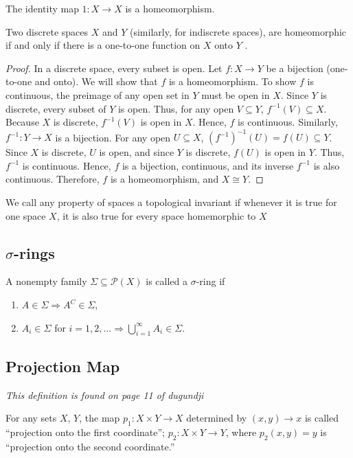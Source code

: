 \documentclass[12pt]{article} %
\begin{document}
\begin{example}
The identity map $1 : X\to X$ is a homeomorphism.
\end{example}

\begin{example}
Two discrete spaces $X$ and $Y$ (similarly, for indiscrete spaces), are homeomorphic if and only if there is a one-to-one function on $X$ onto $Y$ .
\end{example}
\begin{proof}
In a discrete space, every subset is open. Let \( f : X \to Y \) be a bijection (one-to-one and onto). We will show that \( f \) is a homeomorphism. To show \( f \) is continuous, the preimage of any open set in \( Y \) must be open in \( X \). Since \( Y \) is discrete, every subset of \( Y \) is open. Thus, for any open \( V \subseteq Y \),  \( f^{-1}(V) \subseteq X \). Because \( X \) is discrete, \( f^{-1}(V) \) is open in \( X \). Hence, \( f \) is continuous. Similarly, \( f^{-1} : Y \to X \) is a bijection. For any open \( U \subseteq X \), $(f^{-1})^{-1}(U) = f(U) \subseteq Y$. Since \( X \) is discrete, \( U \) is open, and since \( Y \) is discrete, \( f(U) \) is open in \( Y \).  
Thus, \( f^{-1} \) is continuous. Hence, \( f \) is a bijection, continuous, and its inverse \( f^{-1} \) is also continuous. Therefore, \( f \) is a homeomorphism, and \( X \cong Y \).
\end{proof}

\begin{definition}
    We call any property of spaces a topological invariant if whenever it is true for one space $X$, it is also true for every space homemorphic to $X$
\end{definition}


\subsection{$\sigma$-rings}
\begin{definition}
	A nonempty family $\Sigma \subseteq \mathcal{P}(X)$ is called a $\sigma$-ring if
	\begin{enumerate}
		\item $A \in \Sigma \Rightarrow  A^C \in \Sigma$,
		\item $A_i \in \Sigma$ for $i = 1, 2, \dots \Rightarrow \bigcup_{i=1}^\infty A_i \in \Sigma$.
	\end{enumerate}
\end{definition}

\subsection{Projection Map}
\textit{This definition is found on page 11 of dugundji}
\begin{definition}
	\parencite{Dugundji1966} For any sets $X$, $Y$, the map $p_1 \colon X \times Y \to X$ determined by $(x,y) \to x$ is called ``projection onto the first coordinate''; $p_2 \colon X \times Y \to Y$, where $p_2(x,y) = y$ is ``projection onto the second coordinate.''
\end{definition}
\end{document}
